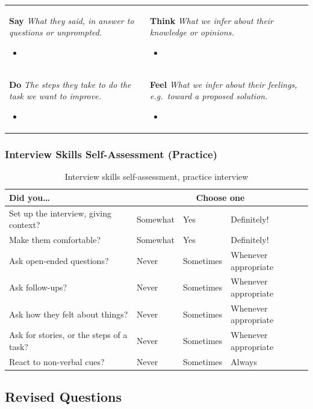\documentclass[12pt]{article}
\newcommand{\empathymap}[5]{%
  \begin{center}
  \renewcommand{\arraystretch}{1.3}
  \begin{tabularx}{\textwidth}{|>{\raggedright\arraybackslash}X|>{\raggedright\arraybackslash}X|}
    \multicolumn{2}{c}{\textbf{Empathy Map --- #1}}\\
    \hline
    \textbf{Say} \newline \footnotesize\emph{What they said, in answer to questions or unprompted.} \normalsize #2
    &
    \textbf{Think} \newline \footnotesize\emph{What we infer about their knowledge or opinions.} \normalsize #3
    \\ \hline
    \textbf{Do} \newline \footnotesize\emph{The steps they take to do the task we want to improve.} \normalsize #4
    &
    \textbf{Feel} \newline \footnotesize\emph{What we infer about their feelings, e.g.\ toward a proposed solution.} \normalsize #5
    \\ \hline
  \end{tabularx}
  \end{center}}
\begin{document}
\empathymap{Practice interviewee (PP)}
{\begin{itemize}[leftmargin=*,nosep] \item \todo{} \end{itemize}}
{\begin{itemize}[leftmargin=*,nosep] \item \todo{} \end{itemize}}
{\begin{itemize}[leftmargin=*,nosep] \item \todo{} \end{itemize}}
{\begin{itemize}[leftmargin=*,nosep] \item \todo{} \end{itemize}}

\subsubsection{Interview Skills Self-Assessment (Practice)}


\begin{table}[H]
\centering
\caption{Interview skills self-assessment, practice interview}
\label{TblSkillsPractice}
\begin{tabularx}{\textwidth}{Xlll}
\toprule
\textbf{Did you\ldots} & \multicolumn{3}{c}{\textbf{Choose one}}\\
\midrule
Set up the interview, giving context? & Somewhat & Yes & Definitely!\\
Make them comfortable? & Somewhat & Yes & Definitely!\\
Ask open-ended questions? & Never & Sometimes & Whenever appropriate\\
Ask follow-ups? & Never & Sometimes & Whenever appropriate\\
Ask how they felt about things? & Never & Sometimes & Whenever appropriate\\
Ask for stories, or the steps of a task? & Never & Sometimes & Whenever appropriate\\
React to non-verbal cues? & Never & Sometimes & Always\\
\bottomrule
\end{tabularx}
\end{table}

\subsection{Revised Questions} \label{SecRevisedQs}
\end{document}
